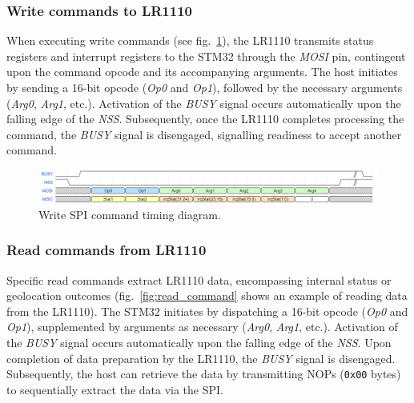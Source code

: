 \subsubsection{Write commands to LR1110}
When executing write commands (see fig.~\ref{fig:write_command}), the LR1110 transmits status registers and interrupt registers to the STM32 through the \textit{MOSI} pin, contingent upon the command opcode and its accompanying arguments. The host initiates by sending a 16-bit opcode (\textit{Op0} and \textit{Op1}), followed by the necessary arguments (\textit{Arg0}, \textit{Arg1}, etc.). Activation of the \textit{BUSY} signal occurs automatically upon the falling edge of the \textit{NSS}. Subsequently, once the LR1110 completes processing the command, the \textit{BUSY} signal is disengaged, signalling readiness to accept another command.

\begin{figure}[H]
    \centering
    \includegraphics[width=1\textwidth]{figures/write_command.png}
    \caption{Write SPI command timing diagram.}
    \label{fig:write_command}
\end{figure}

\subsubsection{Read commands from LR1110}
Specific read commands extract LR1110 data, encompassing internal status or geolocation outcomes (fig.~\ref{fig:read_command} shows an example of reading data from the LR1110). The STM32 initiates by dispatching a 16-bit opcode (\textit{Op0} and \textit{Op1}), supplemented by arguments as necessary (\textit{Arg0}, \textit{Arg1}, etc.). Activation of the \textit{BUSY} signal occurs automatically upon the falling edge of the \textit{NSS}. Upon completion of data preparation by the LR1110, the \textit{BUSY} signal is disengaged. Subsequently, the host can retrieve the data by transmitting NOPs (\texttt{0x00} bytes) to sequentially extract the data via the \ac{SPI}.

